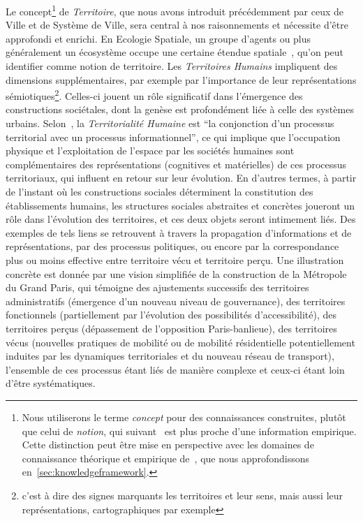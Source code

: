 {Le concept\footnote{Nous utiliserons le terme \emph{concept} pour des connaissances construites, plutôt que celui de \emph{notion}, qui suivant~\cite{raffestin1978construits} est plus proche d'une information empirique. Cette distinction peut être mise en perspective avec les domaines de connaissance théorique et empirique de~\cite{livet2010}, que nous approfondissons en~\ref{sec:knowledgeframework}.} de \emph{Territoire}, que nous avons introduit précédemment par ceux de Ville et de Système de Ville, sera central à nos raisonnements et nécessite d'être approfondi et enrichi. En Ecologie Spatiale, un groupe d'agents ou plus généralement un écosystème occupe une certaine étendue spatiale~\cite{tilman1997spatial}, qu'on peut identifier comme notion de territoire. Les \emph{Territoires Humains} impliquent des dimensions supplémentaires, par exemple par l'importance de leur représentations sémiotiques\footnote{c'est à dire des signes marquants les territoires et leur sens, mais aussi leur représentations, cartographiques par exemple}. Celles-ci jouent un rôle significatif dans l'émergence des constructions sociétales, dont la genèse est profondément liée à celle des systèmes urbains. Selon~\cite{raffestin1988reperes}, la \emph{Territorialité Humaine} est ``la conjonction d'un processus territorial avec un processus informationnel'', ce qui implique que l'occupation physique et l'exploitation de l'espace par les sociétés humaines sont complémentaires des représentations (cognitives et matérielles) de ces processus territoriaux, qui influent en retour sur leur évolution. En d'autres termes, à partir de l'instant où les constructions sociales déterminent la constitution des établissements humains, les structures sociales abstraites et concrètes joueront un rôle dans l'évolution des territoires, et ces deux objets seront intimement liés. Des exemples de tels liens se retrouvent à travers la propagation d'informations et de représentations, par des processus politiques, ou encore par la correspondance plus ou moins effective entre territoire vécu et territoire perçu. Une illustration concrète est donnée par une vision simplifiée de la construction de la Métropole du Grand Paris, qui témoigne des ajustements successifs des territoires administratifs (émergence d'un nouveau niveau de gouvernance), des territoires fonctionnels (partiellement par l'évolution des possibilités d'accessibilité), des territoires perçus (dépassement de l'opposition Paris-banlieue), des territoires vécus (nouvelles pratiques de mobilité ou de mobilité résidentielle potentiellement induites par les dynamiques territoriales et du nouveau réseau de transport), l'ensemble de ces processus étant liés de manière complexe et ceux-ci étant loin d'être systématiques.
}




